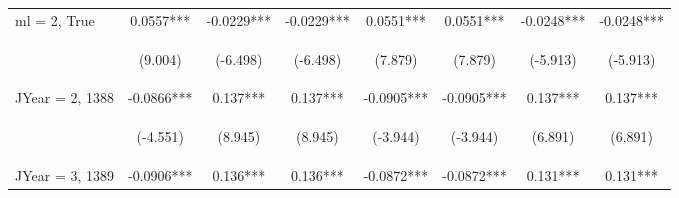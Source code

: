 \documentclass[]{article}
\begin{document}
\begin{center}
\begin{tabular}{lccccccc}
ml = 2, True & 0.0557*** & -0.0229*** & -0.0229*** & 0.0551*** & 0.0551*** & -0.0248*** & -0.0248*** \\
\vspace{4pt} & \begin{footnotesize}(9.004)\end{footnotesize} & \begin{footnotesize}(-6.498)\end{footnotesize} & \begin{footnotesize}(-6.498)\end{footnotesize} & \begin{footnotesize}(7.879)\end{footnotesize} & \begin{footnotesize}(7.879)\end{footnotesize} & \begin{footnotesize}(-5.913)\end{footnotesize} & \begin{footnotesize}(-5.913)\end{footnotesize} \\
JYear = 2, 1388 & -0.0866*** & 0.137*** & 0.137*** & -0.0905*** & -0.0905*** & 0.137*** & 0.137*** \\
\vspace{4pt} & \begin{footnotesize}(-4.551)\end{footnotesize} & \begin{footnotesize}(8.945)\end{footnotesize} & \begin{footnotesize}(8.945)\end{footnotesize} & \begin{footnotesize}(-3.944)\end{footnotesize} & \begin{footnotesize}(-3.944)\end{footnotesize} & \begin{footnotesize}(6.891)\end{footnotesize} & \begin{footnotesize}(6.891)\end{footnotesize} \\
JYear = 3, 1389 & -0.0906*** & 0.136*** & 0.136*** & -0.0872*** & -0.0872*** & 0.131*** & 0.131*** \\

\end{tabular}
\end{center}
\end{document}
